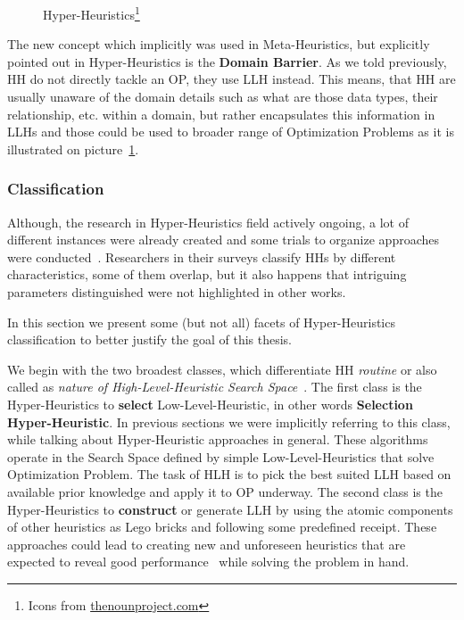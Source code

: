 \begin{figure}
	\centering
	
	\caption[Hyper-Heuristics]{Hyper-Heuristics\protect\footnote{Icons from \href{https://thenounproject.com/}{thenounproject.com}}}
	\label{bg:pic:HH}
\end{figure}



The new concept which implicitly was used in Meta-Heuristics, but explicitly pointed out in Hyper-Heuristics is the \textbf{Domain Barrier}.
As we told previously, HH do not directly tackle an OP, they use LLH instead. This means, that HH are usually unaware of the domain details such as what are those data types, their relationship, etc. within a domain, but rather encapsulates this information in LLHs and those could be used to broader range of Optimization Problems as it is illustrated on picture~\ref{bg:pic:HH}.


\subsubsection{Classification}
Although, the research in Hyper-Heuristics field actively ongoing, a lot of different instances were already created and some trials to organize approaches were conducted~\cite{ryser2014review,drake2019recent,burke2019classification}.
Researchers in their surveys classify HHs by different characteristics, some of them overlap, but it also happens that intriguing parameters distinguished were not highlighted in other works. 

In this section we present some (but not all) facets of Hyper-Heuristics classification to better justify the goal of this thesis.


We begin with the two broadest classes, which differentiate HH \textit{routine} or also called as \textit{nature of High-Level-Heuristic Search Space}~\cite{burke2013hyper,burke2019classification,drake2019recent}.
The first class is the Hyper-Heuristics to \textbf{select} Low-Level-Heuristic, in other words \textbf{Selection Hyper-Heuristic}. In previous sections we were implicitly referring to this class, while talking about Hyper-Heuristic approaches in general. These algorithms operate in the Search Space defined by simple Low-Level-Heuristics that solve Optimization Problem. The task of HLH is to pick the best suited LLH based on available prior knowledge and apply it to OP underway.
The second class is the Hyper-Heuristics to \textbf{construct} or generate LLH by using the atomic components of other heuristics as Lego bricks and following some predefined receipt. These approaches could lead to creating new and unforeseen heuristics that are expected to reveal good performance~\cite{burke2019classification} while solving the problem in hand.


